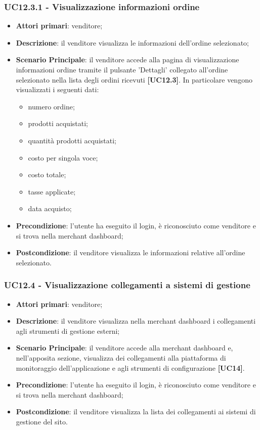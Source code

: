 \subsubsection{UC12.3.1 - Visualizzazione informazioni ordine}
\begin{itemize}
\item \textbf{Attori primari}: venditore;
\item \textbf{Descrizione}: il venditore visualizza le informazioni dell'ordine selezionato;
\item \textbf{Scenario Principale}: il venditore accede alla pagina di visualizzazione informazioni ordine tramite il pulsante 'Dettagli' collegato all'ordine selezionato nella lista degli ordini ricevuti \textbf{[UC12.3]}. In particolare vengono visualizzati i seguenti dati:
\begin{itemize}
	\item numero ordine;
	\item prodotti acquistati;
	\item quantità prodotti acquistati;
	\item costo per singola voce;
	\item costo totale;
	\item tasse applicate;
	\item data acquisto;
\end{itemize}
\item \textbf{Precondizione}: l'utente ha eseguito il login, è riconosciuto come venditore e si trova nella merchant dashboard;
\item \textbf{Postcondizione}: il venditore visualizza le informazioni relative all'ordine selezionato.
\end{itemize}

\subsubsection{UC12.4 - Visualizzazione collegamenti a sistemi di gestione}
\begin{itemize}
\item \textbf{Attori primari}: venditore;
\item \textbf{Descrizione}: il venditore visualizza nella merchant dashboard i collegamenti agli strumenti di gestione esterni;
\item \textbf{Scenario Principale}: il venditore accede alla merchant dashboard e, nell'apposita sezione, visualizza dei collegamenti alla piattaforma di monitoraggio dell'applicazione e agli strumenti di configurazione \textbf{[UC14]}.
\item \textbf{Precondizione}: l'utente ha eseguito il login, è riconosciuto come venditore e si trova nella merchant dashboard;
\item \textbf{Postcondizione}: il venditore visualizza la lista dei collegamenti ai sistemi di gestione del sito.
\end{itemize}

